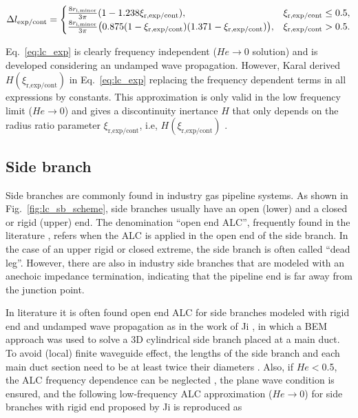 \documentclass[12pt]{article}
\begin{document}
\begin{equation} \label{eq:lc_exp_dasilva}
	\Delta l_{\text{exp/cont}} = 
	\begin{cases}
		\frac{8 r_{\text{i,minor}} }{ 3 \pi} (1 - 1.238 \xi_{\text{r,exp/cont}}  ), \hspace{10mm} & \xi_{\text{r,exp/cont}}  \leq 0.5, \\
		\frac{8 r_{\text{i,minor}} }{ 3 \pi} \big( 0.875 (1 - \xi_{\text{r,exp/cont}}  )(1.371 - \xi_{\text{r,exp/cont}}  ) \big),  &  \xi_{\text{r,exp/cont}}  > 0.5.
	\end{cases}
\end{equation}

Eq.~\ref{eq:lc_exp} is clearly frequency independent ($He \rightarrow$0 solution) and is developed considering an undamped wave propagation. However, Karal \cite{karal} derived $H(\xi_{\text{r,exp/cont}})$ in Eq.~\ref{eq:lc_exp} replacing the frequency dependent terms in all expressions by constants. This approximation is only valid in the low frequency limit ($He \rightarrow$0) and gives a discontinuity inertance $H$ that
only depends on the radius ratio parameter $\xi_{\text{r,exp/cont}}$, i.e, $H( \xi_{\text{r,exp/cont}} )$ \cite{peat_exp_falc}. 

\subsection{Side branch}

Side branches are commonly found in industry gas pipeline systems. As shown in Fig.~\ref{fig:lc_sb_scheme}, side branches usually have an open (lower) and a closed or rigid (upper) end. The denomination ``open end \acrshort{ALC}'', frequently found in the literature \cite{dang}, refers when the \acrshort{ALC} is applied in the open end of the side branch. In the case of an upper rigid or closed extreme, the side branch is often called ``dead leg''. However, there are also in industry side branches that are modeled with an anechoic impedance termination, indicating that the pipeline end is far away from the junction point. 

In literature it is often found open end \acrshort{ALC} for side branches modeled with rigid end and undamped wave propagation as in the work of Ji \cite{JI}, in which a \acrshort{BEM} approach was used to solve a 3D cylindrical side branch placed at a main duct. To avoid (local) finite waveguide effect, the lengths of the side branch and each main duct section need to be at least twice their diameters \cite{JI}. Also, if $He<$0.5, the \acrshort{ALC} frequency dependence can be neglected \cite{dalmont_sb, JI}, the plane wave condition is ensured, and the following low-frequency \acrshort{ALC} approximation ($He \rightarrow 0$) for side branches with rigid end proposed by Ji \cite{JI} is reproduced as
\end{document}
